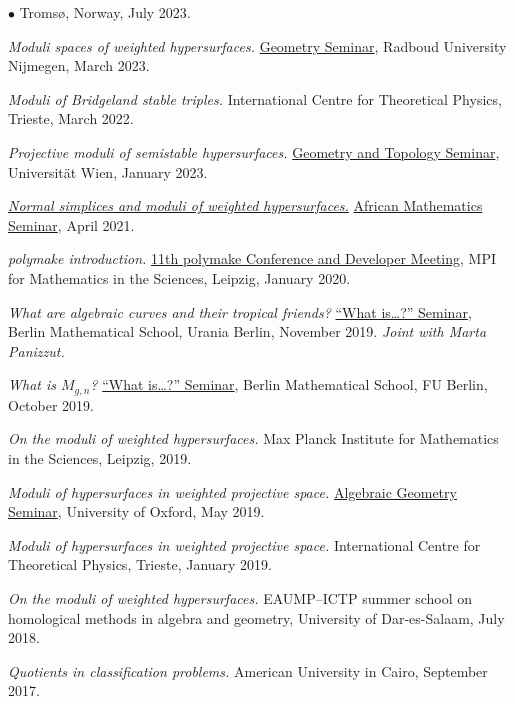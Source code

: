 \documentclass[10pt]{article}
\newenvironment{cvlist}%
  {\begin{list}{$\bullet$}{%
     \setlength{\leftmargin}{1.1em}\setlength{\labelwidth}{0.8em}%
     \setlength{\itemsep}{0.12cm}\setlength{\parsep}{0pt}%
     \setlength{\topsep}{0pt}\setlength{\partopsep}{0pt}}}%
  {\end{list}}
\begin{document}
\begin{cvlist}
Troms\o, Norway, July 2023.
\item \emph{Moduli spaces of weighted hypersurfaces.}
\href{https://www.math.ru.nl/geometryseminar/}{Geometry Seminar},
Radboud University Nijmegen, March 2023.
\item \emph{Moduli of Bridgeland stable triples.} International Centre for
Theoretical Physics, Trieste, March 2022.
\item \emph{Projective moduli of semistable hypersurfaces.}
\href{https://mathematik.univie.ac.at/en/research/seminars/geometry-and-topology-seminar/}{Geometry and Topology Seminar},
Universit\"at Wien, January 2023.
\item \href{https://www.youtube.com/watch?v=5IlL8cVqH2U}{\em Normal simplices and moduli of weighted hypersurfaces.}
\href{https://sites.google.com/view/africa-math-seminar/home}{African Mathematics Seminar}, April 2021.
\item \emph{polymake introduction.}
\href{https://www.mis.mpg.de/calendar/conferences/2020/polymake2020}{11th polymake Conference and Developer Meeting},
MPI for Mathematics in the Sciences, Leipzig, January 2020.
\item \emph{What are algebraic curves and their tropical friends?}
\href{https://whatisseminar.xyz/talks.html}{``What is\ldots?'' Seminar},
Berlin Mathematical School, Urania Berlin, November 2019.
{\em Joint with Marta Panizzut.}
\item \emph{What is $M_{g,n}$?}
\href{https://whatisseminar.xyz/talks.html}{``What is\ldots?'' Seminar},
Berlin Mathematical School, FU Berlin, October 2019.
\item \emph{On the moduli of weighted hypersurfaces.}
Max Planck Institute for Mathematics in the Sciences, Leipzig, 2019.
\item \emph{Moduli of hypersurfaces in weighted projective space.}
\href{https://www.maths.ox.ac.uk/node/32016}{Algebraic Geometry Seminar},
University of Oxford, May 2019.
\item \emph{Moduli of hypersurfaces in weighted projective space.}
International Centre for Theoretical Physics, Trieste, January 2019.
\item \emph{On the moduli of weighted hypersurfaces.}
EAUMP--ICTP summer school on homological methods in algebra and geometry,
University of Dar-es-Salaam, July 2018.
\item \emph{Quotients in classification problems.}
American University in Cairo, September 2017.
\end{cvlist}
\end{document}
